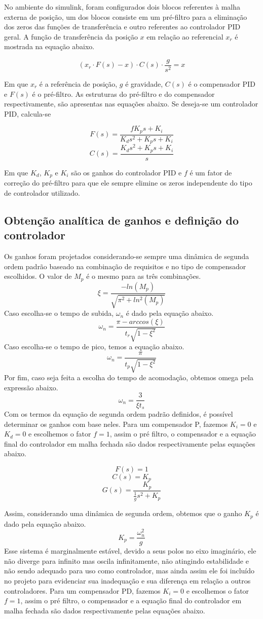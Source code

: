 \documentclass[a4paper, 12pt]{article} %
\begin{document}
No ambiente do simulink, foram configurados dois blocos referentes à malha externa de posição, um dos blocos consiste em um pré-filtro para a eliminação dos zeros das funções de transferência e outro referentes ao controlador PID geral. A função de transferência da posição $x$ em relação ao referencial $x_r$ é mostrada na equação abaixo.

\[(x_r\cdot F(s)-x)\cdot C(s)\cdot\frac{g}{s^2}=x\]

Em que $x_r$ é a referência de posição, $g$ é gravidade, $C(s)$ é o compensador PID e $F(s)$ é o pré-filtro. As estruturas do pré-filtro e do compensador respectivamente, são apresentas nas equações abaixo. Se deseja-se um controlador PID, calcula-se

\[F(s) = \frac{fK_ps+K_i}{K_ds^2+K_ps+K_i}\]
\[C(s)=\frac{K_ds^2+K_ps+K_i}{s}\]

Em que $K_d$, $K_p$ e $K_i$ são os ganhos do controlador PID e $f$ é um fator de correção do pré-filtro para que ele sempre elimine os zeros independente do tipo de controlador utilizado.

\subsection{Obtenção analítica de ganhos e definição do controlador}

Os ganhos foram projetados considerando-se sempre uma dinâmica de segunda ordem padrão baseado na combinação de requisitos e no tipo de compensador escolhidos. O valor de $M_p$ é o mesmo para as três combinações.
\[\xi = \frac{-ln(M_p)}{\sqrt{\pi^2+ln^2(M_p)}}\]
Caso escolha-se o tempo de subida, $\omega_n$ é dado pela equação abaixo.
\[\omega_n=\frac{\pi-arccos(\xi)}{t_r\sqrt{1-\xi^2}}\]
Caso escolha-se o tempo de pico, temos a equação abaixo.
\[\omega_n=\frac{\pi}{t_p\sqrt{1-\xi^2}}\]
Por fim, caso seja feita a escolha do tempo de acomodação, obtemos omega pela expressão abaixo.
\[\omega_n=\frac{3}{\xi t_s}\]
Com os termos da equação de segunda ordem padrão definidos, é possível determinar os ganhos com base neles. Para um compensador P, fazemos $K_i=0$ e $K_d=0$ e escolhemos o fator $f=1$, assim o pré filtro, o compensador e a equação final do controlador em malha fechada são dados respectivamente pelas equações abaixo.

\[F(s)=1\]
\[C(s)=K_p\]
\[G(s)=\frac{K_p}{\frac{1}{g}s^2+K_p}\]

Assim, considerando uma dinâmica de segunda ordem, obtemos que o ganho $K_p$ é dado pela equação abaixo.
\[K_p=\frac{\omega_n^2}{g}\]
Esse sistema é marginalmente estável, devido a seus polos no eixo imaginário, ele não diverge para infinito mas oscila infinitamente, não atingindo estabilidade e não sendo adequado para uso como controlador, mas ainda assim ele foi incluído no projeto para evidenciar sua inadequação e sua diferença em relação a outros controladores. Para um compensador PD, fazemos $K_i=0$ e escolhemos o fator $f=1$, assim o pré filtro, o compensador e a equação final do controlador em malha fechada são dados respectivamente pelas equações abaixo.
\end{document}
